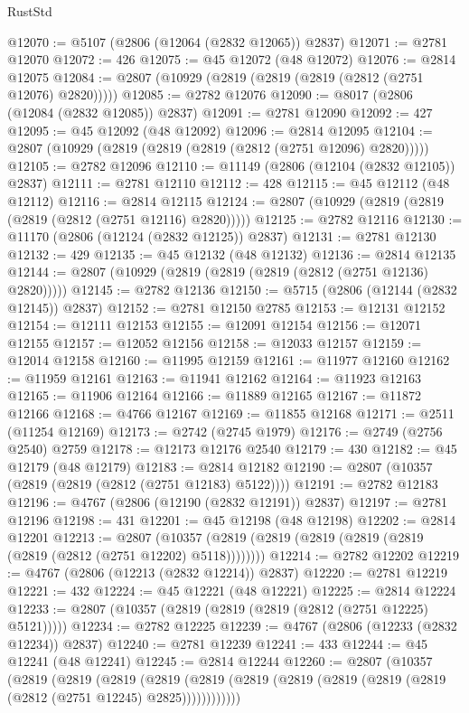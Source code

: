 \begin{lexlean}{RustStd}
\begin{coremodule}
@12070 := @5107 (@2806 (@12064 (@2832 @12065)) @2837)
@12071 := @2781 @12070
@12072 := 426
@12075 := @45 @12072 (@48 @12072)
@12076 := @2814 @12075
@12084 := @2807 (@10929 (@2819 (@2819 (@2819 (@2812 (@2751 @12076) @2820)))))
@12085 := @2782 @12076
@12090 := @8017 (@2806 (@12084 (@2832 @12085)) @2837)
@12091 := @2781 @12090
@12092 := 427
@12095 := @45 @12092 (@48 @12092)
@12096 := @2814 @12095
@12104 := @2807 (@10929 (@2819 (@2819 (@2819 (@2812 (@2751 @12096) @2820)))))
@12105 := @2782 @12096
@12110 := @11149 (@2806 (@12104 (@2832 @12105)) @2837)
@12111 := @2781 @12110
@12112 := 428
@12115 := @45 @12112 (@48 @12112)
@12116 := @2814 @12115
@12124 := @2807 (@10929 (@2819 (@2819 (@2819 (@2812 (@2751 @12116) @2820)))))
@12125 := @2782 @12116
@12130 := @11170 (@2806 (@12124 (@2832 @12125)) @2837)
@12131 := @2781 @12130
@12132 := 429
@12135 := @45 @12132 (@48 @12132)
@12136 := @2814 @12135
@12144 := @2807 (@10929 (@2819 (@2819 (@2819 (@2812 (@2751 @12136) @2820)))))
@12145 := @2782 @12136
@12150 := @5715 (@2806 (@12144 (@2832 @12145)) @2837)
@12152 := @2781 @12150 @2785
@12153 := @12131 @12152
@12154 := @12111 @12153
@12155 := @12091 @12154
@12156 := @12071 @12155
@12157 := @12052 @12156
@12158 := @12033 @12157
@12159 := @12014 @12158
@12160 := @11995 @12159
@12161 := @11977 @12160
@12162 := @11959 @12161
@12163 := @11941 @12162
@12164 := @11923 @12163
@12165 := @11906 @12164
@12166 := @11889 @12165
@12167 := @11872 @12166
@12168 := @4766 @12167
@12169 := @11855 @12168
@12171 := @2511 (@11254 @12169)
@12173 := @2742 (@2745 @1979)
@12176 := @2749 (@2756 @2540) @2759
@12178 := @12173 @12176 @2540
@12179 := 430
@12182 := @45 @12179 (@48 @12179)
@12183 := @2814 @12182
@12190 := @2807 (@10357 (@2819 (@2819 (@2812 (@2751 @12183) @5122))))
@12191 := @2782 @12183
@12196 := @4767 (@2806 (@12190 (@2832 @12191)) @2837)
@12197 := @2781 @12196
@12198 := 431
@12201 := @45 @12198 (@48 @12198)
@12202 := @2814 @12201
@12213 := @2807
    (@10357 (@2819 (@2819 (@2819 (@2819 (@2819 (@2819 (@2812 (@2751 @12202) @5118))))))))
@12214 := @2782 @12202
@12219 := @4767 (@2806 (@12213 (@2832 @12214)) @2837)
@12220 := @2781 @12219
@12221 := 432
@12224 := @45 @12221 (@48 @12221)
@12225 := @2814 @12224
@12233 := @2807 (@10357 (@2819 (@2819 (@2819 (@2812 (@2751 @12225) @5121)))))
@12234 := @2782 @12225
@12239 := @4767 (@2806 (@12233 (@2832 @12234)) @2837)
@12240 := @2781 @12239
@12241 := 433
@12244 := @45 @12241 (@48 @12241)
@12245 := @2814 @12244
@12260 := @2807
    (@10357
      (@2819
        (@2819
          (@2819
            (@2819 (@2819 (@2819 (@2819 (@2819 (@2819 (@2819 (@2812 (@2751 @12245) @2825))))))))))))

\end{coremodule}
\end{lexlean}
